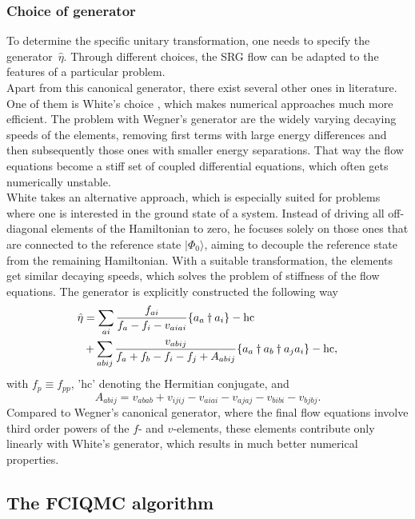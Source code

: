 \documentclass[aps,twocolumn,showpacs,floatfix,nofootinbib,preprintnumbers,superscriptaddress,amsmath,amssymb]{revtex4-1}
\begin{document}
\subsubsection*{Choice of generator}
To determine the specific unitary transformation, one needs to specify
the generator~$\hat{\eta}$. Through different choices, the SRG flow
can be adapted to the features of a particular problem.\\

Apart from this canonical generator, there exist several other ones in
literature. One of them is White's choice
\cite{White:cond-mat0201346}, which makes numerical approaches much
more efficient.  The problem with Wegner's generator are the widely
varying decaying speeds of the elements, removing first terms with
large energy differences and then subsequently those ones with smaller
energy separations.  That way the flow equations become a stiff set of
coupled differential equations, which often gets numerically
unstable.\\ White takes an alternative approach, which is especially
suited for problems where one is interested in the ground state of a
system. Instead of driving all off-diagonal elements of the
Hamiltonian to zero, he focuses solely on those ones that are
connected to the reference state $|\Phi_0\rangle$, aiming to decouple
the reference state from the remaining Hamiltonian. With a suitable
transformation, the elements get similar decaying speeds, which solves
the problem of stiffness of the flow equations.  The generator is
explicitly constructed the following way
\cite{PhysRevLett.106.222502,White:cond-mat0201346}
\begin{align}
\hat{\eta} &= \sum_{ai} \frac{f_{ai}}{f_a-f_i-v_{aiai}}\lbrace
a_a\dagger a_i\rbrace -\text{hc} \notag \\ & + \sum_{abij}
\frac{v_{abij}}{f_a+f_b-f_i-f_j+A_{abij}}\lbrace a_a\dagger a_b\dagger
a_j a_i\rbrace - \text{hc},
\label{eq:WhiteFull}
\end{align}
with $f_p \equiv f_{pp}$, 'hc' denoting the Hermitian conjugate, and
\[
A_{abij} = v_{abab} + v_{ijij} - v_{aiai} - v_{ajaj} - v_{bibi} -
v_{bjbj}.
\label{eq:White7}
\]
Compared to Wegner's canonical generator, where the final flow
equations involve third order powers of the $f$- and $v$-elements,
these elements contribute only linearly with White's generator, which
results in much better numerical properties.


\subsection{The FCIQMC algorithm}
\end{document}
